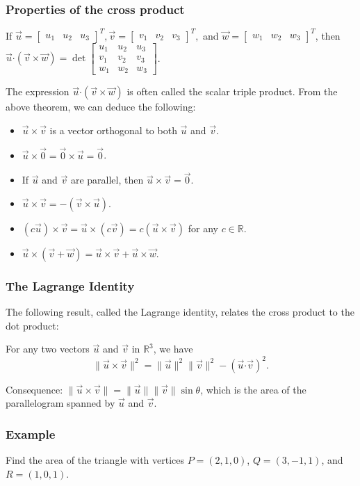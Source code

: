 \documentclass[11pt,t]{beamer}
\newcommand{\R}{\mathbb{R}}
\newcommand{\len}[1]{\lVert #1\rVert}
\newcommand{\dotp}{\boldsymbol{\cdot}}
\begin{document}
\begin{frame}\frametitle{Properties of the cross product}
 \begin{theorem}
  If $\vec{u}=\begin{bmatrix}u_1&u_2&u_3\end{bmatrix}^T, \vec{v}=\begin{bmatrix}v_1&v_2&v_3\end{bmatrix}^T,$ and $\vec{w}=\begin{bmatrix}w_1&w_2&w_3\end{bmatrix}^T$, then $\vec{u}\dotp(\vec{v}\times\vec{w}) = \det\begin{bmatrix}u_1&u_2&u_3\\v_1&v_2&v_3\\w_1&w_2&w_3\end{bmatrix}$.
 \end{theorem}
The expression $\vec{u}\dotp(\vec{v}\times \vec{w})$ is often called the \alert{scalar triple product}.
From the above theorem, we can deduce the following:
\begin{itemize}
 \item $\vec{u}\times \vec{v}$ is a vector orthogonal to both $\vec{u}$ and $\vec{v}$.
 \item $\vec{u}\times \vec{0} = \vec{0}\times \vec{u} = \vec{0}$.
 \item If $\vec{u}$ and $\vec{v}$ are parallel, then $\vec{u}\times \vec{v}=\vec{0}$.
 \item $\vec{u}\times \vec{v} = -(\vec{v}\times \vec{u})$.
 \item $(c\vec{u})\times \vec{v} = \vec{u}\times (c\vec{v}) = c(\vec{u}\times \vec{v})$ for any $c\in\R$.
 \item $\vec{u}\times (\vec{v}+\vec{w}) = \vec{u}\times \vec{v}+\vec{u}\times\vec{w}$.
\end{itemize}
\end{frame}
\begin{frame}\frametitle{The Lagrange Identity}
The following result, called the \alert{Lagrange identity}, relates the cross product to the dot product:
\begin{theorem}
 For any two vectors $\vec{u}$ and $\vec{v}$ in $\R^3$, we have
\[
 \len{\vec{u}\times\vec{v}}^2 = \len{\vec{u}}^2\len{\vec{v}}^2-(\vec{u}\dotp\vec{v})^2.
\]
\end{theorem}
Consequence: $\len{\vec{u}\times \vec{v}} = \len{\vec{u}}\len{\vec{v}}\sin\theta$, which is the area of the parallelogram spanned by $\vec{u}$ and $\vec{v}$.
\end{frame}
\begin{frame}\frametitle{Example}
 Find the area of the triangle with vertices $P=(2,1,0)$, $Q=(3,-1,1)$, and $R=(1,0,1)$.
\end{frame}
\end{document}
